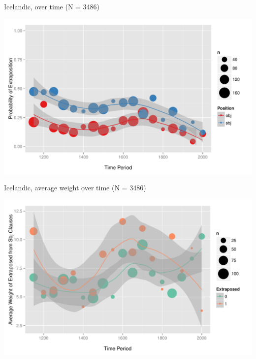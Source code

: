 \documentclass[hyperref={pdfpagelabels=false}]{beamer}
\begin{document}
\begin{frame}{Icelandic, over time (N = 3486)}

\begin{center}
\includegraphics[width=1.1\textwidth]{exSbjObjYearBinned50Loessice.pdf}
\end{center}
\end{frame}


\begin{frame}{Icelandic, average weight over time (N = 3486)}

\begin{center}
\includegraphics[width=1.1\textwidth]{exWeightYearBinned50Loessice.pdf}
\end{center}
\end{frame}
\end{document}
